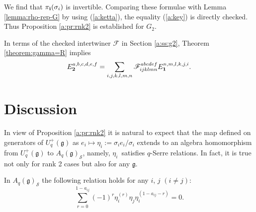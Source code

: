 \documentclass[pdftex]{sigma}
\newcommand{\geh}{\mathfrak{g}}
\begin{document}
We f\/ind that $\pi_{\bf i}(\sigma_i)$ is invertible.
Comparing these formulae with Lemma \ref{lemma:rho-rep-G}
by using (\ref{a:ketta}), the equality (\ref{a:key}) is directly checked.
Thus Proposition \ref{a:pr:rnk2} is established for $G_2$.

In terms of the checked intertwiner $\mathscr{F}$ in Section \ref{a:ss:g2},
Theorem \ref{theorem:gamma=R} implies
\begin{gather*}
E^{a,b,c,d,e,f}_{\bf 2} = \sum_{i,j,k,l,m,n}
\mathscr{F}^{a b c d e f}_{i j k l m n} E^{n,m,l,k,j,i}_{\bf 1}.
\end{gather*}


\section{Discussion}\label{a:sec6}

In view of Proposition \ref{a:pr:rnk2} it is natural to expect that the map def\/ined on generators
of $U_q^+(\geh)$ as $e_i \mapsto \eta_i:=\sigma_ie_i/\sigma_i$ extends to an algebra homomorphism from
$U_q^+(\geh)$ to $A_q(\geh)_\mathcal{S}$, namely, $\eta_i$~satisf\/ies $q$-Serre relations. In fact, it is
true not only for rank 2 cases but also for any $\geh$.

\begin{theorem}\label{th:serre}
In $A_q(\geh)_\mathcal{S}$ the following relation holds for any $i$, $j$ $(i\ne j)$:
\[
\sum_{r=0}^{1-a_{ij}}(-1)^r\eta_i^{(r)}\eta_j \eta_i^{(1-a_{ij}-r)}=0.
\]
\end{theorem}
\end{document}
